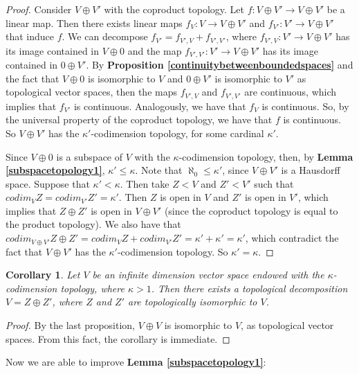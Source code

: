 \documentclass[a4paper,12pt]{article}
\newtheorem{cor}[prop]{Corollary}
\theoremstyle{bloco}
\begin{document}
\begin{proof}Consider $V \oplus V'$ with the coproduct topology. Let $f: V \oplus V' \rightarrow V \oplus V'$ be a linear map. Then there exists linear maps $f_{V}: V \rightarrow V\oplus V'$ and ${f_{V'}: V' \rightarrow V \oplus V'}$ that induce $f$. We can decompose $f_{V'} = f_{V',V}+f_{V',V'}$, where $f_{V',V}: V' \rightarrow V \oplus V'$ has its image contained in $V \oplus 0$ and the map $f_{V',V'}: V' \rightarrow V \oplus V'$ has its image contained in $0 \oplus V'$. By \textbf{Proposition \ref{continuitybetweenboundedspaces}} and the fact that $V\oplus 0$ is isomorphic to $V$ and $0 \oplus V'$ is isomorphic to $V'$ as topological vector spaces, then the maps $f_{V',V}$ and $f_{V',V'}$ are continuous, which implies that $f_{V'}$ is continuous. Analogously, we have that $f_{V}$ is continuous. So, by the universal property of the coproduct topology, we have that $f$ is continuous. So $V\oplus V'$ has the $\kappa'$-codimension topology, for some cardinal $\kappa'$. 

Since $V \oplus 0$ is a subspace of $V$ with the $\kappa$-codimension topology, then, by \textbf{Lemma \ref{subspacetopology1}}, $\kappa' \leqslant \kappa$. Note that $\aleph_{0} \leqslant \kappa'$, since $V\oplus V'$ is a Hausdorff space. Suppose that $\kappa' < \kappa$. Then take $Z < V$ and $Z' < V'$ such that $codim_{V} Z = codim_{V'} Z' = \kappa'$. Then $Z$ is open in $V$ and $Z'$ is open in $V'$, which implies that $Z\oplus Z'$ is open in $V \oplus V'$ (since the coproduct topology is equal to the product topology). We also have that $codim_{V\oplus V'}Z\oplus Z' = codim_{V}Z+codim_{V'}Z' = \kappa'+\kappa' = \kappa'$, which contradict the fact that $V\oplus V'$ has the $\kappa'$-codimension topology. So $\kappa' = \kappa$.
\end{proof}

\begin{cor}Let $V$ be an infinite dimension vector space endowed with the $\kappa$-codimension topology, where $\kappa > 1$. Then there exists a topological decomposition $V = Z \oplus Z'$, where $Z$ and $Z'$ are topologically isomorphic to $V$.
\end{cor}

\begin{proof}By the last proposition, $V \oplus V$ is isomorphic to $V$, as topological vector spaces. From this fact, the corollary is immediate.
\end{proof}

Now we are able to improve \textbf{Lemma \ref{subspacetopology1}}:
\end{document}
